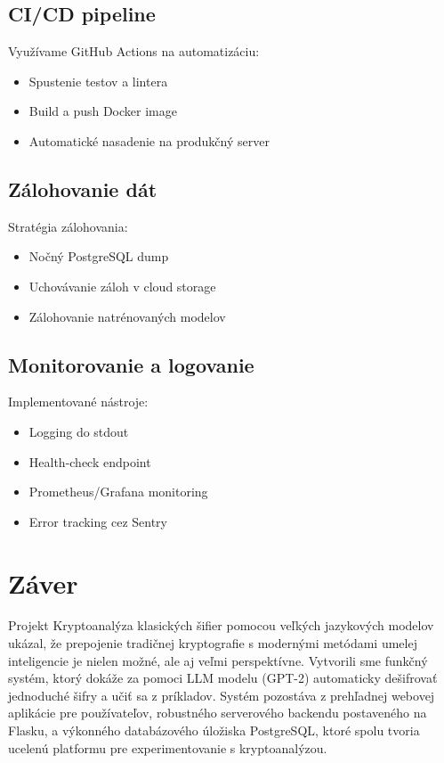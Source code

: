 \documentclass[12pt,a4paper]{article}
\begin{document}
\subsection{CI/CD pipeline}
Využívame GitHub Actions na automatizáciu:
\begin{itemize}
    \item Spustenie testov a lintera
    \item Build a push Docker image
    \item Automatické nasadenie na produkčný server
\end{itemize}

\subsection{Zálohovanie dát}
Stratégia zálohovania:
\begin{itemize}
    \item Nočný PostgreSQL dump
    \item Uchovávanie záloh v cloud storage
    \item Zálohovanie natrénovaných modelov
\end{itemize}

\subsection{Monitorovanie a logovanie}
Implementované nástroje:
\begin{itemize}
    \item Logging do stdout
    \item Health-check endpoint
    \item Prometheus/Grafana monitoring
    \item Error tracking cez Sentry
\end{itemize}

\section{Záver}
Projekt Kryptoanalýza klasických šifier pomocou veľkých jazykových modelov ukázal, že prepojenie tradičnej kryptografie s modernými metódami umelej inteligencie je nielen možné, ale aj veľmi perspektívne. Vytvorili sme funkčný systém, ktorý dokáže za pomoci LLM modelu (GPT-2) automaticky dešifrovať jednoduché šifry a učiť sa z príkladov. Systém pozostáva z prehľadnej webovej aplikácie pre používateľov, robustného serverového backendu postaveného na Flasku, a výkonného databázového úložiska PostgreSQL, ktoré spolu tvoria ucelenú platformu pre experimentovanie s kryptoanalýzou.
\end{document}

